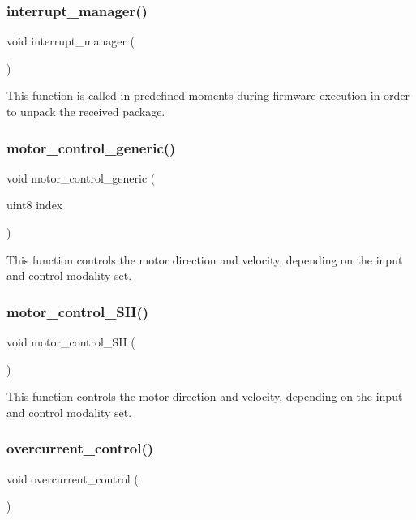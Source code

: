 \subsubsection{interrupt\+\_\+manager()}
{\footnotesize\ttfamily void interrupt\+\_\+manager (\begin{DoxyParamCaption}{ }\end{DoxyParamCaption})}

This function is called in predefined moments during firmware execution in order to unpack the received package. \mbox{\label{interruptions_8c_a4f06bfe4da34859932258358e6a9bbd2}} 
\subsubsection{motor\+\_\+control\+\_\+generic()}
{\footnotesize\ttfamily void motor\+\_\+control\+\_\+generic (\begin{DoxyParamCaption}\item[{uint8}]{index }\end{DoxyParamCaption})}

This function controls the motor direction and velocity, depending on the input and control modality set. \mbox{\label{interruptions_8c_a17436ec2a3bf0398e965c63c8e1a089d}} 
\subsubsection{motor\+\_\+control\+\_\+\+S\+H()}
{\footnotesize\ttfamily void motor\+\_\+control\+\_\+\+SH (\begin{DoxyParamCaption}{ }\end{DoxyParamCaption})}

This function controls the motor direction and velocity, depending on the input and control modality set. \mbox{\label{interruptions_8c_a4e92908805632dc8cab2936d89bb3ba1}} 
\subsubsection{overcurrent\+\_\+control()}
{\footnotesize\ttfamily void overcurrent\+\_\+control (\begin{DoxyParamCaption}{ }\end{DoxyParamCaption})}

